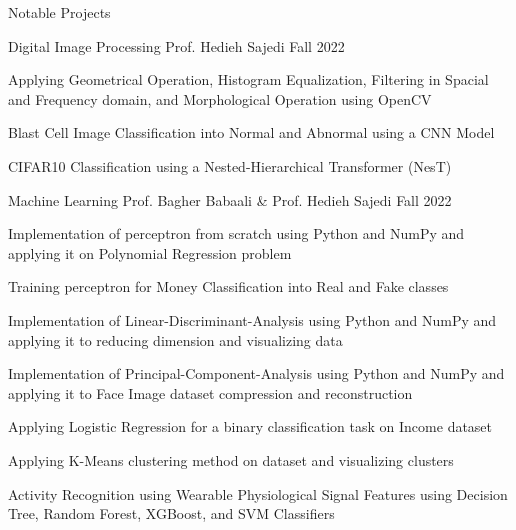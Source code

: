 \documentclass[]{main}
\begin{document}
\begin{section}{Notable Projects}
\begin{subsection}{ Digital Image Processing }{ Prof. Hedieh Sajedi }{ Fall 2022 }{  }
            \item Applying Geometrical Operation, Histogram Equalization, Filtering in Spacial and Frequency domain, and Morphological Operation using OpenCV \;\href{ https://github.com/ckoliber/dipexercises/blob/main/src/exercise1.ipynb }{\faExternalLink*}
            \item Blast Cell Image Classification into Normal and Abnormal using a CNN Model \;\href{ https://github.com/ckoliber/dipexercises/blob/main/src/exercise2.ipynb }{\faExternalLink*}
            \item CIFAR10 Classification using a Nested-Hierarchical Transformer (NesT) \;\href{ https://github.com/ckoliber/dipexercises/blob/main/src/project.ipynb }{\faExternalLink*}
            \end{subsection}
    \begin{subsection}{ Machine Learning }{ Prof. Bagher Babaali \& Prof. Hedieh Sajedi }{ Fall 2022 }{  }
            \item Implementation of perceptron from scratch using Python and NumPy and applying it on Polynomial Regression problem \;\href{ https://github.com/ckoliber/mlexercises/blob/master/src/exercise1.ipynb }{\faExternalLink*}
            \item Training perceptron for Money Classification into Real and Fake classes \;\href{ https://github.com/ckoliber/mlexercises/blob/master/src/exercise2.ipynb }{\faExternalLink*}
            \item Implementation of Linear-Discriminant-Analysis using Python and NumPy and applying it to reducing dimension and visualizing data \;\href{ https://github.com/ckoliber/mlexercises/blob/master/src/exercise3.ipynb }{\faExternalLink*}
            \item Implementation of Principal-Component-Analysis using Python and NumPy and applying it to Face Image dataset compression and reconstruction \;\href{ https://github.com/ckoliber/mlexercises/blob/master/src/exercise4.ipynb }{\faExternalLink*}
            \item Applying Logistic Regression for a binary classification task on Income dataset \;\href{ https://github.com/ckoliber/mlexercises/blob/master/src/exercise5.ipynb }{\faExternalLink*}
            \item Applying K-Means clustering method on dataset and visualizing clusters \;\href{ https://github.com/ckoliber/mlexercises/blob/master/src/exercise6.ipynb }{\faExternalLink*}
            \item Activity Recognition using Wearable Physiological Signal Features using Decision Tree, Random Forest, XGBoost, and SVM Classifiers \;\href{ https://github.com/ckoliber/mlexercises/blob/master/src/exercise1_1.ipynb }{\faExternalLink*}

\end{subsection}
\end{section}
\end{document}
